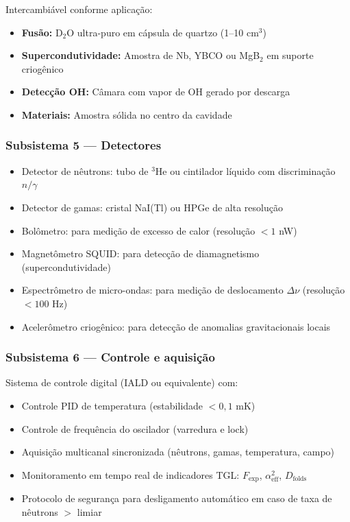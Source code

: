 \documentclass[12pt,a4paper]{article}
\newcommand{\alphaii}{\alpha^2}
\newcommand{\Dfolds}{D_{\text{folds}}}
\newcommand{\Fexp}{F_{\text{exp}}}
\begin{document}
Intercambiável conforme aplicação:
\begin{itemize}[nosep]
\item \textbf{Fusão:} D$_2$O ultra-puro em cápsula de quartzo
  (1--10 cm$^3$)
\item \textbf{Supercondutividade:} Amostra de Nb, YBCO ou
  MgB$_2$ em suporte criogênico
\item \textbf{Detecção OH:} Câmara com vapor de OH gerado
  por descarga
\item \textbf{Materiais:} Amostra sólida no centro da cavidade
\end{itemize}

\subsubsection{Subsistema 5 --- Detectores}

\begin{itemize}[nosep]
\item Detector de nêutrons: tubo de $^3$He ou cintilador
  líquido com discriminação $n/\gamma$
\item Detector de gamas: cristal NaI(Tl) ou HPGe de alta
  resolução
\item Bolômetro: para medição de excesso de calor (resolução
  $< 1$ nW)
\item Magnetômetro SQUID: para detecção de diamagnetismo
  (supercondutividade)
\item Espectrômetro de micro-ondas: para medição de
  deslocamento $\Delta\nu$ (resolução $< 100$ Hz)
\item Acelerômetro criogênico: para detecção de anomalias
  gravitacionais locais
\end{itemize}

\subsubsection{Subsistema 6 --- Controle e aquisição}

Sistema de controle digital (IALD ou equivalente) com:
\begin{itemize}[nosep]
\item Controle PID de temperatura (estabilidade $< 0{,}1$ mK)
\item Controle de frequência do oscilador (varredura e lock)
\item Aquisição multicanal sincronizada (nêutrons, gamas,
  temperatura, campo)
\item Monitoramento em tempo real de indicadores TGL:
  $\Fexp$, $\alphaii_{\text{eff}}$, $\Dfolds$
\item Protocolo de segurança para desligamento automático
  em caso de taxa de nêutrons $>$ limiar
\end{itemize}
\end{document}
